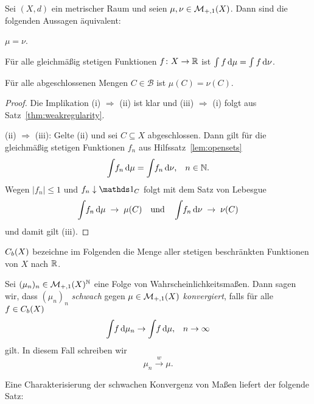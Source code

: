 \documentclass[../main/main.tex]{subfiles}
\begin{document}
	\begin{Satz}
		Sei $(X,d)$ ein metrischer Raum und seien $\mu, \nu \in \mathcal{M}_{+,1}(X)$. 
		Dann sind die folgenden Aussagen äquivalent:
		\begin{equivalentthm}
			\item $\mu = \nu$.
			\item Für alle gleichmäßig stetigen Funktionen $f \colon X \to \mathbb{R}$ ist
					 $\int_{} \, f \, \mathrm{d}\mu = \int_{} \, f \, \mathrm{d}\nu$.
			\item Für alle abgeschlossenen Mengen $C \in \mathcal{B}$ ist $\mu(C) = \nu(C)$.
		\end{equivalentthm}
	\end{Satz}

	\begin{proof}
		Die Implikation (i) $\Rightarrow$ (ii) ist klar und (iii) 
		$\Rightarrow$ (i) folgt aus Satz~\ref{thm:weakregularity}.
		
		(ii) $\Rightarrow$ (iii): Gelte (ii) und sei $C \subseteq X$ abgeschlossen. 
		Dann gilt für die gleichmäßig stetigen Funktionen $f_n$ aus Hilfssatz~\ref{lem:opensets}
		$$\int_{} \, f_n \, \mathrm{d}\mu = \int_{} \, f_n \, \mathrm{d}\nu\text{,} \quad n \in \mathbb{N} \text{.}$$
		Wegen $| f_n | \leq 1$ und $f_n \convdown \indfct_C$ folgt mit dem Satz von Lebesgue 
		$$\int_{} \, f_n \, \mathrm{d}\mu \; \to \; \mu(C) \quad \text{und} \quad \int_{} \, f_n \, \mathrm{d}\nu 
			\; \to \; \nu(C)$$
		und damit gilt (iii).
	\end{proof}

	$C_b(X)$ bezeichne 
	im Folgenden die Menge aller stetigen beschränkten Funktionen von $X$ nach $\mathbb{R}$.

	\begin{Definition}
		\label{def:weakconvergence}
		Sei $(\mu_n)_n \in \mathcal{M}_{+,1}(X)^{\mathbb{N}}$ eine Folge von Wahrscheinlichkeitsmaßen.
		Dann sagen wir, dass $(\mu_n)_n$ 
		\emph{schwach} gegen $\mu \in \mathcal{M}_{+,1}(X)$ \emph{konvergiert}, 
		falls für alle $f \in C_b(X)$
		$$\int_{} \, f \, \mathrm{d}\mu_n \to \int_{} \, f \, \mathrm{d}\mu\text{,} 
			\quad n \to \infty $$
		gilt. In diesem Fall schreiben wir
		$$\mu_n \xrightarrow{w} \mu \text{.}$$
	\end{Definition}

	Eine Charakterisierung der schwachen Konvergenz von Maßen liefert der folgende Satz:
\end{document}
